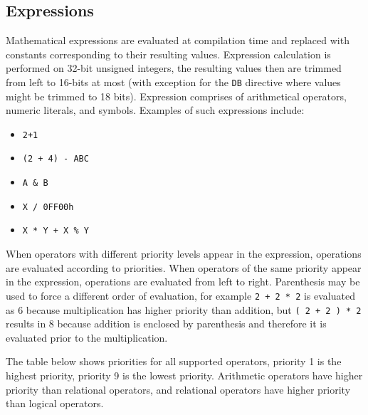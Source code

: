     \subsection{Expressions}
        Mathematical expressions are evaluated at compilation time and replaced with constants corresponding to their resulting values. Expression calculation is performed on 32-bit unsigned integers, the resulting values then are trimmed from left to 16-bits at most (with exception for the \texttt{DB} directive where values might be trimmed to 18 bits). Expression comprises of arithmetical operators, numeric literals, and symbols. Examples of such expressions include:

        \begin{itemize}
            \item \texttt{2+1}
            \item \texttt{(2 + 4) - ABC}
            \item \texttt{A \& B}
            \item \texttt{X / 0FF00h}
            \item \texttt{X * Y + X \% Y}
        \end{itemize}

        When operators with different priority levels appear in the expression, operations are evaluated according to priorities. When operators of the same priority appear in the expression, operations are evaluated from left to right. Parenthesis may be used to force a different order of evaluation, for example \texttt{2 + 2 * 2} is evaluated as 6 because multiplication has higher priority than addition, but \texttt{( 2 + 2 ) * 2} results in 8 because addition is enclosed by parenthesis and therefore it is evaluated prior to the multiplication.

        The table below shows priorities for all supported operators, priority 1 is the highest priority, priority 9 is the lowest priority. Arithmetic operators have higher priority than relational operators, and relational operators have higher priority than logical operators.

